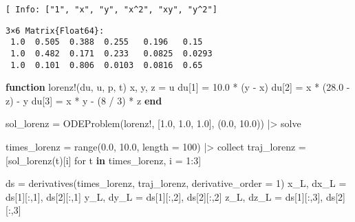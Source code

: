 \documentclass[
]{article}
\newenvironment{Shaded}{\begin{snugshade}}{\end{snugshade}}
\newcommand{\FloatTok}[1]{\textcolor[rgb]{0.68,0.00,0.00}{#1}}
\newcommand{\FunctionTok}[1]{\textcolor[rgb]{0.28,0.35,0.67}{#1}}
\newcommand{\KeywordTok}[1]{\textcolor[rgb]{0.00,0.23,0.31}{\textbf{#1}}}
\newcommand{\NormalTok}[1]{\textcolor[rgb]{0.00,0.23,0.31}{#1}}
\newcommand{\OperatorTok}[1]{\textcolor[rgb]{0.37,0.37,0.37}{#1}}
\begin{document}
\begin{verbatim}
[ Info: ["1", "x", "y", "x^2", "xy", "y^2"]
\end{verbatim}

\begin{verbatim}
3×6 Matrix{Float64}:
 1.0  0.505  0.388  0.255   0.196   0.15
 1.0  0.482  0.171  0.233   0.0825  0.0293
 1.0  0.101  0.806  0.0103  0.0816  0.65
\end{verbatim}

\clearpage

\begin{Shaded}
\begin{Highlighting}[]
\KeywordTok{function} \FunctionTok{lorenz!}\NormalTok{(du, u, p, t)}
\NormalTok{    x, y, z }\OperatorTok{=}\NormalTok{ u}
\NormalTok{    du[}\FloatTok{1}\NormalTok{] }\OperatorTok{=} \FloatTok{10.0} \OperatorTok{*}\NormalTok{ (y }\OperatorTok{{-}}\NormalTok{ x)}
\NormalTok{    du[}\FloatTok{2}\NormalTok{] }\OperatorTok{=}\NormalTok{ x }\OperatorTok{*}\NormalTok{ (}\FloatTok{28.0} \OperatorTok{{-}}\NormalTok{ z) }\OperatorTok{{-}}\NormalTok{ y}
\NormalTok{    du[}\FloatTok{3}\NormalTok{] }\OperatorTok{=}\NormalTok{ x }\OperatorTok{*}\NormalTok{ y }\OperatorTok{{-}}\NormalTok{ (}\FloatTok{8} \OperatorTok{/} \FloatTok{3}\NormalTok{) }\OperatorTok{*}\NormalTok{ z}
\KeywordTok{end}

\NormalTok{sol\_lorenz }\OperatorTok{=} \FunctionTok{ODEProblem}\NormalTok{(lorenz!, [}\FloatTok{1.0}\NormalTok{, }\FloatTok{1.0}\NormalTok{, }\FloatTok{1.0}\NormalTok{], (}\FloatTok{0.0}\NormalTok{, }\FloatTok{10.0}\NormalTok{)) }\OperatorTok{|\textgreater{}}\NormalTok{ solve}

\NormalTok{times\_lorenz }\OperatorTok{=} \FunctionTok{range}\NormalTok{(}\FloatTok{0.0}\NormalTok{, }\FloatTok{10.0}\NormalTok{, length }\OperatorTok{=} \FloatTok{100}\NormalTok{) }\OperatorTok{|\textgreater{}}\NormalTok{ collect}
\NormalTok{traj\_lorenz }\OperatorTok{=}\NormalTok{ [}\FunctionTok{sol\_lorenz}\NormalTok{(t)[i] for t }\KeywordTok{in}\NormalTok{ times\_lorenz, i }\OperatorTok{=} \FloatTok{1}\OperatorTok{:}\FloatTok{3}\NormalTok{]}

\NormalTok{ds }\OperatorTok{=} \FunctionTok{derivatives}\NormalTok{(times\_lorenz, traj\_lorenz, derivative\_order }\OperatorTok{=} \FloatTok{1}\NormalTok{)}
\NormalTok{x\_L, dx\_L }\OperatorTok{=}\NormalTok{ ds[}\FloatTok{1}\NormalTok{][}\OperatorTok{:}\NormalTok{,}\FloatTok{1}\NormalTok{], ds[}\FloatTok{2}\NormalTok{][}\OperatorTok{:}\NormalTok{,}\FloatTok{1}\NormalTok{]}
\NormalTok{y\_L, dy\_L }\OperatorTok{=}\NormalTok{ ds[}\FloatTok{1}\NormalTok{][}\OperatorTok{:}\NormalTok{,}\FloatTok{2}\NormalTok{], ds[}\FloatTok{2}\NormalTok{][}\OperatorTok{:}\NormalTok{,}\FloatTok{2}\NormalTok{]}
\NormalTok{z\_L, dz\_L }\OperatorTok{=}\NormalTok{ ds[}\FloatTok{1}\NormalTok{][}\OperatorTok{:}\NormalTok{,}\FloatTok{3}\NormalTok{], ds[}\FloatTok{2}\NormalTok{][}\OperatorTok{:}\NormalTok{,}\FloatTok{3}\NormalTok{]}


\end{Highlighting}
\end{Shaded}
\end{document}
